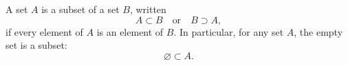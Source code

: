A set $A$ is a subset of a set $B$, written
$$A \subset B \quad \text{or} \quad B \supset A,$$
if every element of $A$ is an element of $B$. In particular, for any set $A$, the empty set is a subset:
$$\varnothing \subset A.$$
